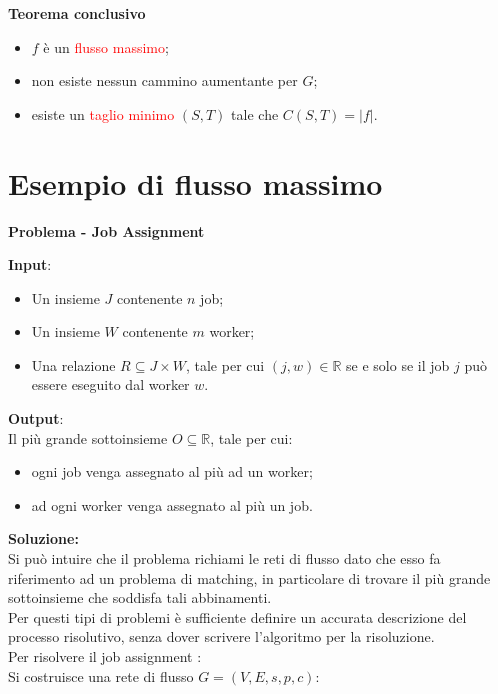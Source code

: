 \documentclass[../cheatSheetAlgoritmi.tex]{subfiles}
\begin{document}
\bigskip
\textbf{Teorema conclusivo}
\begin{itemize}
	\item $f$ è un \textcolor{red}{flusso massimo};
	\item non esiste nessun cammino aumentante per $G$;
	\item esiste un \textcolor{red}{taglio minimo} $(S, T)$ tale che $C(S, T) = |f|$.
\end{itemize}

\section{Esempio di flusso massimo}
\textbf{Problema - Job Assignment}

\bigskip
\textbf{Input}: 
\begin{itemize}
	\item Un insieme $J$ contenente $n$ job;
	\item Un insieme $W$ contenente $m$ worker;
	\item Una relazione $R \subseteq J \times W$, tale per cui $(j, w) \in \mathbb{R}$ se e solo se il job $j$ può essere eseguito dal worker $w$.
\end{itemize}
\textbf{Output}:\\
 Il più grande sottoinsieme $O \subseteq \mathbb{R}$, tale per cui:
\begin{itemize}
	\item ogni job venga assegnato al più ad un worker;
	\item ad ogni worker venga assegnato al più un job.
\end{itemize}
\textbf{Soluzione:} \\
Si può intuire che il problema richiami le reti di flusso dato che esso fa riferimento ad un problema di matching, in particolare di trovare il più grande sottoinsieme che soddisfa tali abbinamenti. \\
Per questi tipi di problemi è sufficiente definire un accurata descrizione del processo risolutivo, senza dover scrivere l'algoritmo per la risoluzione. \\
Per risolvere il job assignment :\\ 
Si costruisce una rete di flusso $G = (V, E, s, p, c)$:
\end{document}
